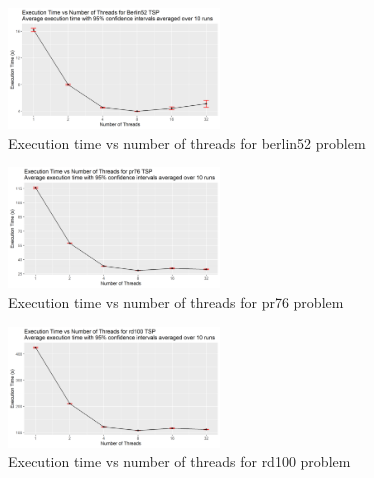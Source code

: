 \documentclass[10pt,journal,compsoc]{IEEEtran}
\begin{document}
\begin{figure}
    \centering
    \includegraphics[width=0.5\textwidth]{png/06.png}
    \caption{Execution time vs number of threads for berlin52 problem}
    \label{fig:6}
\end{figure}
\begin{figure}
    \centering
    \includegraphics[width=0.5\textwidth]{png/07.png}
    \caption{Execution time vs number of threads for pr76 problem}
    \label{fig:7}
\end{figure}
\begin{figure}
    \centering
    \includegraphics[width=0.5\textwidth]{png/08.png}
    \caption{Execution time vs number of threads for rd100 problem}
    \label{fig:8}
\end{figure}



%
%
\end{document}
